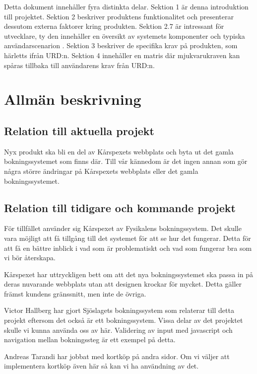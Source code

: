 \documentclass[a4paper, twoside, 11pt, titlepage]{article}
\begin{document}
	Detta dokument innehåller fyra distinkta delar. Sektion 1 är denna introduktion till projektet. Sektion 2 beskriver produktens funktionalitet och presenterar dessutom externa faktorer kring produkten. Sektion 2.7 är intressant för utvecklare, ty den innehåller en översikt av systemets komponenter och typiska användarscenarion .  Sektion 3 beskriver de specifika krav på produkten, som härletts ifrån URD:n. Sektion 4 innehåller en matris där mjukvarukraven kan spåras tillbaka till användarens krav från URD:n.

\clearpage
\section{Allmän beskrivning}



	\subsection{Relation till aktuella projekt}


	Nyx produkt ska bli en del av Kårspexets webbplats och byta ut det gamla bokningssystemet som finns där. Till vår kännedom är det ingen annan som gör några större ändringar på Kårspexets webbplats eller det gamla bokningssystemet.

	\subsection{Relation till tidigare och kommande projekt}


	För tillfället använder sig Kårspexet av Fysikalens bokningssystem. Det skulle vara möjligt att få tillgång till det systemet för att se hur det fungerar. Detta för att få en bättre inblick i vad som är problematiskt och vad som fungerar bra som vi bör återskapa.

	Kårspexet har uttryckligen bett om att det nya bokningssystemet ska passa in på deras nuvarande webbplats utan att designen krockar för mycket. Detta gäller främst kundens gränssnitt, men inte de övriga.

	Victor Hallberg har gjort Sjöslagets bokningssystem som relaterar till detta projekt eftersom det också är ett bokningssystem. Vissa delar av det projektet skulle vi kunna använda oss av här. Validering av input med javascript och navigation mellan bokningssteg är ett exempel på detta.

	Andreas Tarandi har jobbat med kortköp på andra sidor. Om vi väljer att implementera kortköp även här så kan vi ha användning av det.
\end{document}
